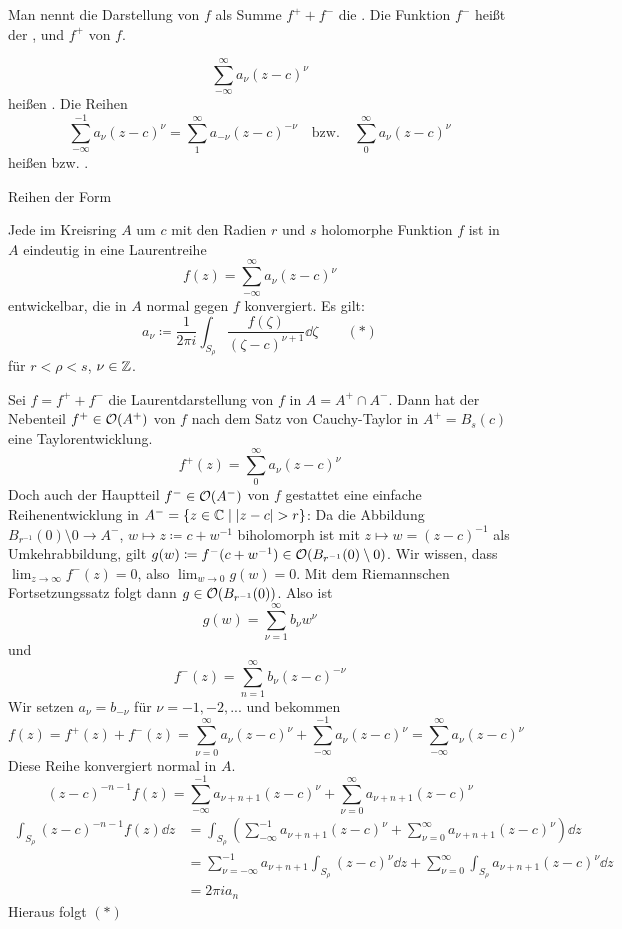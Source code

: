 Man nennt die Darstellung von $ f $ als Summe $ f^++f^- $ die . Die Funktion $ f^- $ hei\ss t der , und $ f^+ $  von $ f $.
\begin{definition}
	\[ \sum_{-\infty}^{\infty}a_\nu(z-c)^\nu \]
	hei\ss en . Die Reihen
	\[ \sum_{-\infty}^{-1}a_\nu(z-c)^\nu=\sum_{1}^{\infty}a_{-\nu}(z-c)^{-\nu}\quad\text{bzw.}\quad\sum_0^\infty a_\nu(z-c)^\nu \]
	hei\ss en  bzw. .
\end{definition}
Reihen der Form

\begin{satz}
	Jede im Kreisring $ A $ um $ c $ mit den Radien $ r $ und $ s $ holomorphe Funktion $ f $ ist in $ A $ eindeutig in eine Laurentreihe
	\[ f(z)=\sum_{-\infty}^{\infty}a_\nu(z-c)^\nu \]
	entwickelbar, die in $ A $ normal gegen $ f $ konvergiert. Es gilt:
	\[ a_\nu\coloneqq\frac{1}{2\pi i}\int_{S_\rho}\frac{f(\zeta)}{(\zeta-c)^{\nu+1}}\dd\zeta\qquad(\ast) \]
	f\"ur $ r<\rho<s $, $ \nu\in\mathbb{Z} $.
\end{satz}
\begin{beweis}
	Sei $ f=f^++f^- $ die Laurentdarstellung von $ f $ in $ A=A^+\cap A^- $. Dann hat der Nebenteil $ f^+\in\mathcal O(A^+) $ von $ f $ nach dem Satz von Cauchy-Taylor in $ A^+=B_s(c) $ eine Taylorentwicklung.
	\[ f^+(z)=\sum_{0}^{\infty}a_\nu(z-c)^\nu \]
	Doch auch der Hauptteil $ f^-\in\mathcal O(A^-) $ von $ f $ gestattet eine einfache Reihenentwicklung in $ A^-=\lbrace z\in\C\mid |z-c|>r\rbrace $: Da die Abbildung $ B_{r^{-1}}(0)\setminus 0\rightarrow A^- $, $ w\mapsto z\coloneqq c+w^{-1} $ biholomorph ist mit $ z\mapsto w=(z-c)^{-1} $ als Umkehrabbildung, gilt $ g(w)\coloneqq f^-(c+w^{-1})\in\mathcal O(B_{r^{-1}}(0)\setminus 0) $. Wir wissen, dass $ \lim_{z\to\infty}f^-(z)=0 $, also $ \lim_{w\to 0}g(w)=0 $. Mit dem Riemannschen Fortsetzungssatz folgt dann $ g\in\mathcal O(B_{r^{-1}}(0)) $. Also ist
	\[ g(w)=\sum_{\nu=1}^\infty b_\nu w^\nu \]
	und
	\[ f^-(z)=\sum_{n=1}^\infty b_\nu(z-c)^{-\nu} \]
	Wir setzen $ a_\nu=b_{-\nu} $ f\"ur $ \nu=-1,-2,... $ und bekommen
	\[ f(z)=f^+(z)+f^-(z)=\sum_{\nu=0}^{\infty}a_\nu(z-c)^\nu+\sum_{-\infty}^{-1}a_\nu(z-c)^\nu=\sum_{-\infty}^{\infty}a_\nu(z-c)^\nu \]
	Diese Reihe konvergiert normal in $ A $.
	\[ (z-c)^{-n-1}f(z)=\sum_{-\infty}^{-1}a_{\nu+n+1}(z-c)^\nu+\sum_{\nu=0}^\infty a_{\nu+n+1}(z-c)^\nu \]
	\begin{align*} \int_{S_\rho}(z-c)^{-n-1}f(z)\dd z&=\int_{S_\rho}\left(\sum_{-\infty}^{-1}a_{\nu+n+1}(z-c)^\nu+\sum_{\nu=0}^\infty a_{\nu+n+1}(z-c)^\nu\right)\dd z\\&=\sum_{\nu=-\infty}^{-1}a_{\nu+n+1}\int_{S_\rho}(z-c)^{\nu}\dd z+\sum_{\nu=0}^{\infty}\int_{S_\rho}a_{\nu+n+1}(z-c)^{\nu}\dd z\\&=2\pi i a_n \end{align*}
	Hieraus folgt $ (\ast) $
\end{beweis}
